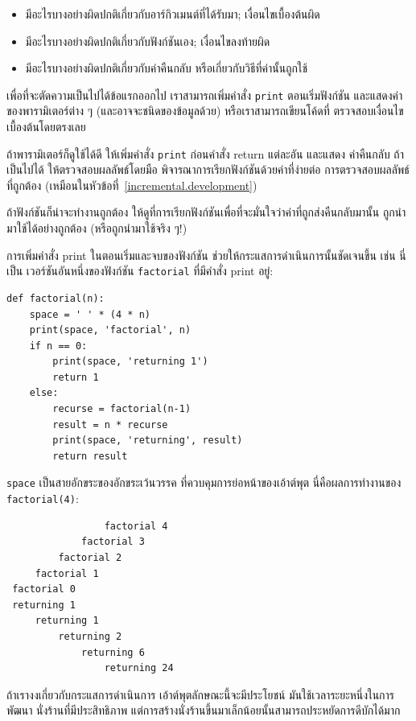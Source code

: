 \begin{itemize}

\item มีอะไรบางอย่างผิดปกติเกี่ยวกับอาร์กิวเมนต์ที่ได้รับมา; เงื่อนไขเบื้องต้นผิด

\item มีอะไรบางอย่างผิดปกติเกี่ยวกับฟังก์ชันเอง; เงื่อนไขลงท้ายผิด

\item มีอะไรบางอย่างผิดปกติเกี่ยวกับค่าคืนกลับ หรือเกี่ยวกับวิธีที่ค่านั้นถูกใช้

\end{itemize}

เพื่อที่จะตัดความเป็นไปได้ข้อแรกออกไป เราสามารถเพิ่มคำสั่ง {\tt print} ตอนเริ่มฟังก์ชัน
และแสดงค่าของพารามิเตอร์ต่าง ๆ (และอาจจะชนิดของข้อมูลด้วย) หรือเราสามารถเขียนโค้ดที่
ตรวจสอบเงื่อนไขเบื้องต้นโดยตรงเลย

ถ้าพารามิเตอร์ก็ดูใช้ได้ดี ให้เพิ่มคำสั่ง {\tt print} ก่อนคำสั่ง return แต่ละอัน และแสดง
ค่าคืนกลับ  ถ้าเป็นไปได้ ให้ตรวจสอบผลลัพธ์โดยมือ พิจารณาการเรียกฟังก์ชันด้วยค่าที่ง่ายต่อ
การตรวจสอบผลลัพธ์ที่ถูกต้อง (เหมือนในหัวข้อที่~\ref{incremental.development})

ถ้าฟังก์ชันก็น่าจะทำงานถูกต้อง ให้ดูที่การเรียกฟังก์ชันเพื่อที่จะมั่นใจว่าค่าที่ถูกส่งคืนกลับมานั้น
ถูกนำมาใช้ได้อย่างถูกต้อง (หรือถูกนำมาใช้จริง ๆ!)

การเพิ่มคำสั่ง print ในตอนเริ่มและจบของฟังก์ชัน ช่วยให้กระแสการดำเนินการนั้นชัดเจนขึ้น เช่น นี่เป็น
เวอร์ชันอันหนึ่งของฟังก์ชัน {\tt factorial} ที่มีคำสั่ง print อยู่:

\begin{verbatim}
def factorial(n):
    space = ' ' * (4 * n)
    print(space, 'factorial', n)
    if n == 0:
        print(space, 'returning 1')
        return 1
    else:
        recurse = factorial(n-1)
        result = n * recurse
        print(space, 'returning', result)
        return result
\end{verbatim}
%
{\tt space} เป็นสายอักขระของอักขระเว้นวรรค ที่ควบคุมการย่อหน้าของเอ้าต์พุต 
นี่คือผลการทำงานของ {\tt factorial(4)}:

\begin{verbatim}
                 factorial 4
             factorial 3
         factorial 2
     factorial 1
 factorial 0
 returning 1
     returning 1
         returning 2
             returning 6
                 returning 24
\end{verbatim}
%
ถ้าเรางงเกี่ยวกับกระแสการดำเนินการ เอ้าต์พุตลักษณะนี้จะมีประโยชน์ มันใช้เวลาระยะหนึ่งในการพัฒนา
นั่งร้านที่มีประสิทธิภาพ แต่การสร้างนั่งร้านขึ้นมาเล็กน้อยนั้นสามารถประหยัดการดีบักได้มาก


